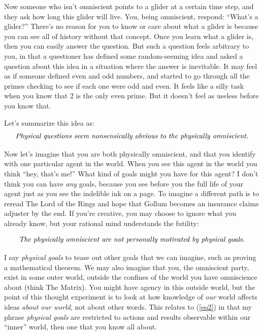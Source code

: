 \documentclass[11pt, oneside]{article}   	%
\begin{document}
Now someone who isn't omniscient points to a glider at a certain time step, and
they ask how long this glider will live. You, being omniscient, respond:
``What's a glider?'' There's no reason for you to know or care about what a
glider is because you can see all of history without that concept. Once you
learn what a glider is, then you can easily answer the question. But such a
question feels arbitrary to you, in that a questioner has defined some
random-seeming idea and asked a question about this idea in a situation where
the answer is inevitable. It may feel as if someone defined even and odd
numbers, and started to go through all the primes checking to see if each one
were odd and even. It feels like a silly task when you know that 2 is the only
even prime. But it doesn't feel as useless before you know that.

Let's summarize this idea as:
\begin{equation}\label{eq1}
    \text{\em Physical questions seem nonsensically obvious to the physically
    omniscient.}
\end{equation}

Now let's imagine that you are both physically omniscient, and that you identify
with one particular agent in the world.
When you see this agent in the world you
think ``hey, that's me!'' What kind of goals might you have for this agent? I
don't think you can have {\em any} goals, because you see before you the
full life of your agent just as you see the indelible ink on a page. To imagine
a different path is to reread The Lord of the Rings and hope that Gollum
becomes an insurance claims adjuster by the end. If you're creative, you may
choose to ignore what you already know, but your rational mind understands the
futility:

\begin{equation}\label{eq2}
    \text{\em The physically omniscient are not personally motivated by
    physical goals.}
\end{equation}
 
I say {\em physical goals} to tease out other goals that we can imagine, such as
proving a mathematical theorem. We may also imagine that you, the omniscient
party, exist in some outer world, outside the confines of the world you have
omniscience about (think The Matrix).
You might have agency in this outside world, but the point of this thought
experiment is to look at how knowledge of {\em our} world affects ideas {\em
about our world}, not about other words. This relates to (\ref{eq2}) in that my
phrase {\em physical goals} are restricted to actions and results observable
within our ``inner'' world, then one that you know all about.
\end{document}
